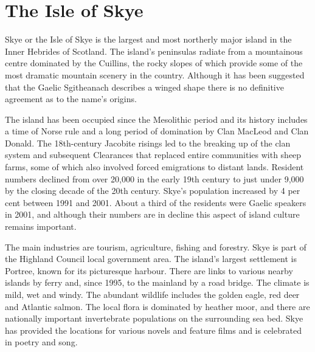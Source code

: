 \documentclass{article}
\begin{document}
\section{The Isle of Skye}

\linenumbers
Skye or the Isle of Skye is the largest and most northerly major island
in the Inner Hebrides of Scotland. The island's peninsulas radiate from
a mountainous centre dominated by the Cuillins, the rocky slopes of
which provide some of the most dramatic mountain scenery in the country.
Although it has been suggested that the Gaelic Sgitheanach describes a
winged shape there is no definitive agreement as to the name's origins.

\modulolinenumbers[5]
The island has been occupied since the Mesolithic period and its history
includes a time of Norse rule and a long period of domination by Clan
MacLeod and Clan Donald. The 18th-century Jacobite risings led to the
breaking up of the clan system and subsequent Clearances that replaced
entire communities with sheep farms, some of which also involved forced
emigrations to distant lands. Resident numbers declined from over 20,000
in the early 19th century to just under 9,000 by the closing decade of
the 20th century. Skye's population increased by 4 per cent between 1991
and 2001. About a third of the residents were Gaelic speakers in 2001,
and although their numbers are in decline this aspect of island culture
remains important.

\nolinenumbers
The main industries are tourism, agriculture, fishing and forestry. Skye
is part of the Highland Council local government area. The island's
largest settlement is Portree, known for its picturesque harbour. There
are links to various nearby islands by ferry and, since 1995, to the
mainland by a road bridge. The climate is mild, wet and windy. The
abundant wildlife includes the golden eagle, red deer and Atlantic
salmon. The local flora is dominated by heather moor, and there are
nationally important invertebrate populations on the surrounding sea
bed. Skye has provided the locations for various novels and feature
films and is celebrated in poetry and song.

\end{document}
